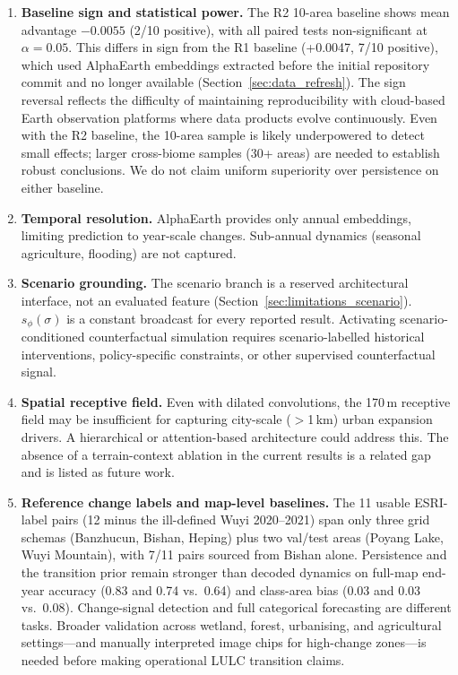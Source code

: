 \documentclass{article}
\begin{document}
\begin{enumerate}
\item \label{lim:power} \textbf{Baseline sign and statistical power.} The R2 10-area baseline shows mean advantage $-0.0055$ (2/10 positive), with all paired tests non-significant at $\alpha=0.05$. This differs in sign from the R1 baseline (+0.0047, 7/10 positive), which used AlphaEarth embeddings extracted before the initial repository commit and no longer available (Section~\ref{sec:data_refresh}). The sign reversal reflects the difficulty of maintaining reproducibility with cloud-based Earth observation platforms where data products evolve continuously. Even with the R2 baseline, the 10-area sample is likely underpowered to detect small effects; larger cross-biome samples (30+ areas) are needed to establish robust conclusions. We do not claim uniform superiority over persistence on either baseline.

\item \label{lim:temporal} \textbf{Temporal resolution.} AlphaEarth provides only annual embeddings, limiting prediction to year-scale changes. Sub-annual dynamics (seasonal agriculture, flooding) are not captured.

\item \label{lim:scenario} \textbf{Scenario grounding.} The scenario branch is a reserved architectural interface, not an evaluated feature (Section~\ref{sec:limitations_scenario}). $s_\phi(\sigma)$ is a constant broadcast for every reported result. Activating scenario-conditioned counterfactual simulation requires scenario-labelled historical interventions, policy-specific constraints, or other supervised counterfactual signal.

\item \label{lim:receptive} \textbf{Spatial receptive field.} Even with dilated convolutions, the 170\,m receptive field may be insufficient for capturing city-scale ($>$1\,km) urban expansion drivers. A hierarchical or attention-based architecture could address this. The absence of a terrain-context ablation in the current results is a related gap and is listed as future work.

\item \label{lim:reference} \textbf{Reference change labels and map-level baselines.} The 11 usable ESRI-label pairs (12 minus the ill-defined Wuyi 2020--2021) span only three grid schemas (Banzhucun, Bishan, Heping) plus two val/test areas (Poyang Lake, Wuyi Mountain), with 7/11 pairs sourced from Bishan alone. Persistence and the transition prior remain stronger than decoded dynamics on full-map end-year accuracy (0.83 and 0.74 vs.\ 0.64) and class-area bias (0.03 and 0.03 vs.\ 0.08). Change-signal detection and full categorical forecasting are different tasks. Broader validation across wetland, forest, urbanising, and agricultural settings---and manually interpreted image chips for high-change zones---is needed before making operational LULC transition claims.


\end{enumerate}
\end{document}
